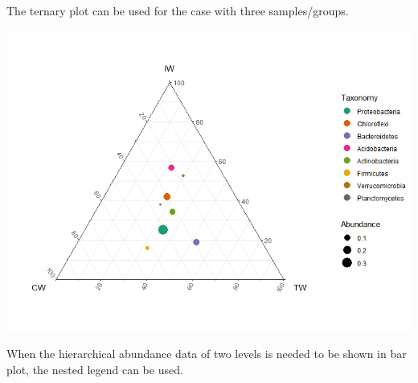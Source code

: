 \documentclass[
]{book}
\newenvironment{Shaded}{\begin{snugshade}}{\end{snugshade}}
\newcommand{\AttributeTok}[1]{\textcolor[rgb]{0.77,0.63,0.00}{#1}}
\newcommand{\DecValTok}[1]{\textcolor[rgb]{0.00,0.00,0.81}{#1}}
\newcommand{\FunctionTok}[1]{\textcolor[rgb]{0.00,0.00,0.00}{#1}}
\newcommand{\NormalTok}[1]{#1}
\newcommand{\OtherTok}[1]{\textcolor[rgb]{0.56,0.35,0.01}{#1}}
\newcommand{\SpecialCharTok}[1]{\textcolor[rgb]{0.00,0.00,0.00}{#1}}
\newcommand{\StringTok}[1]{\textcolor[rgb]{0.31,0.60,0.02}{#1}}
\begin{document}
The ternary plot can be used for the case with three samples/groups.

\begin{Shaded}
\end{Shaded}

\begin{center}\includegraphics[width=600px]{Images/trans_abund_ternary} \end{center}

When the hierarchical abundance data of two levels is needed to be shown in bar plot, the nested legend can be used.
\end{document}
